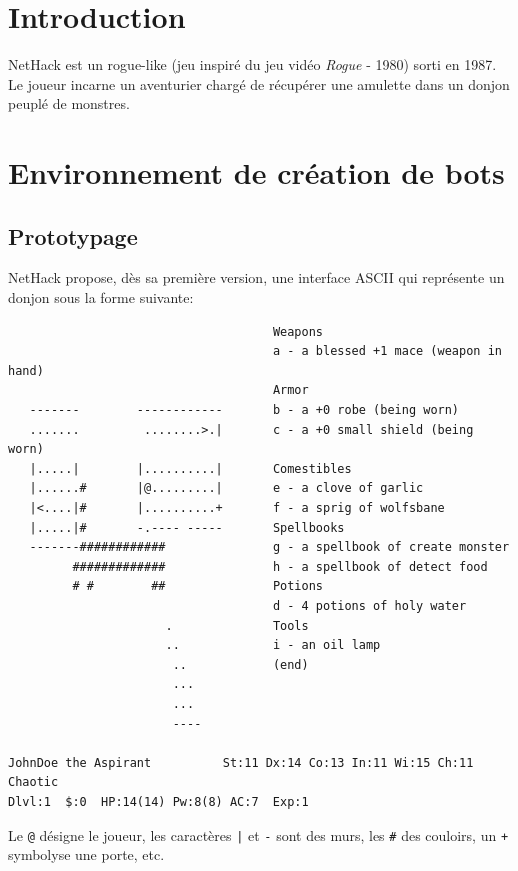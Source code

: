 \documentclass[a4paper]{report}
\begin{document}
\tableofcontents
\pagebreak

\section{Introduction}

NetHack est un rogue-like (jeu inspiré du jeu vidéo \emph{Rogue} - 1980)
sorti en 1987. Le joueur incarne un aventurier chargé de récupérer une
amulette dans un donjon peuplé de monstres.


\section{Environnement de création de bots}

\subsection{Prototypage}

NetHack propose, dès sa première version, une interface ASCII qui représente un donjon sous la forme suivante:

\begin{verbatim}
                                     Weapons
                                     a - a blessed +1 mace (weapon in hand)
                                     Armor
   -------        ------------       b - a +0 robe (being worn)
   .......         ........>.|       c - a +0 small shield (being worn)
   |.....|        |..........|       Comestibles
   |......#       |@.........|       e - a clove of garlic
   |<....|#       |..........+       f - a sprig of wolfsbane
   |.....|#       -.---- -----       Spellbooks
   -------############               g - a spellbook of create monster
         #############               h - a spellbook of detect food
         # #        ##               Potions
                                     d - 4 potions of holy water
                      .              Tools
                      ..             i - an oil lamp
                       ..            (end) 
                       ...
                       ...
                       ----

JohnDoe the Aspirant          St:11 Dx:14 Co:13 In:11 Wi:15 Ch:11  Chaotic
Dlvl:1  $:0  HP:14(14) Pw:8(8) AC:7  Exp:1
\end{verbatim}

Le \verb!@! désigne le joueur, les caractères \verb!|! et \verb!-! sont des murs, les \verb!#! des couloirs, un \verb!+! symbolyse une porte, etc.
\end{document}
